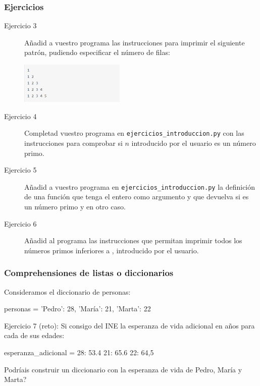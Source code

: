 \documentclass[handout,9pt]{beamer}
\begin{document}
\begin{frame}
  \frametitle{Ejercicios}
  \begin{description}
        \item[Ejercicio 3] Añadid a vuestro programa las instrucciones
          para imprimir el siguiente patrón, pudiendo especificar el
          número de filas:
      \begin{center}
        \includegraphics[width=5cm]{for_exercises_01}
      \end{center}
      
  \item[Ejercicio 4] Completad vuestro programa en {\tt ejercicios\_introduccion.py}
    con las  instrucciones para comprobar si $n$ introducido por el usuario es un
    número primo.
  \item[Ejercicio 5] Añadid a vuestro programa en {\tt ejercicios\_introduccion.py}
    la definición de una función que tenga el entero  como
    argumento y que devuelva  si  es un número primo
    y   en otro caso.
  \item[Ejercicio 6] Añadid al programa las instrucciones que permitan imprimir
    todos los números primos inferiores a , introducido por el usuario.
  \end{description}  
\end{frame}


  \begin{frame}[fragile]
  \frametitle{Comprehensiones de listas o diccionarios}
Consideramos el diccionario de personas:
\begin{pyconsole}
personas = {
   'Pedro': 28,
   'María': 21,
   'Marta': 22
}
\end{pyconsole}
\begin{block}{Ejercicio 7 (reto):}
 Si consigo del INE la esperanza de vida adicional en años para cada
 de sus edades:
 \begin{pyverbatim}
esperanza_adicional = {
     28: 53.4
     21: 65.6
     22: 64,5
}
 \end{pyverbatim}
Podríais construir un diccionario con la esperanza de vida de  Pedro, María y
Marta?
\end{block}
\end{frame}
  
\end{document}
